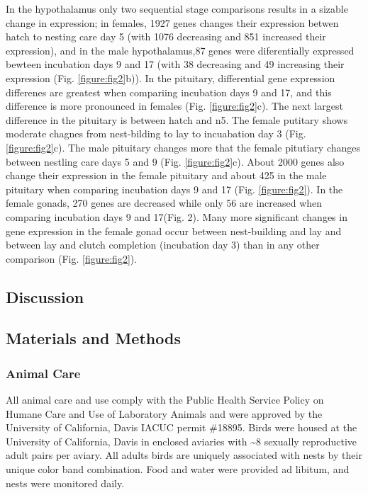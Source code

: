In the hypothalamus only two sequential stage comparisons results in a
sizable change in expression; in females, 1927 genes changes their
expression betwen hatch to nesting care day 5 (with 1076 decreasing and
851 increased their expression), and in the male hypothalamus,87 genes
were diferentially expressed bewteen incubation days 9 and 17 (with 38
decreasing and 49 increasing their expression (Fig.
\ref{figure:fig2}b)). In the pituitary, differential gene expression
differenes are greatest when compariing incubation days 9 and 17, and
this difference is more pronounced in females (Fig. \ref{figure:fig2}c).
The next largest difference in the pituitary is between hatch and n5.
The female putitary shows moderate chagnes from nest-bilding to lay to
incuabation day 3 (Fig. \ref{figure:fig2}c). The male pituitary changes
more that the female pitutiary changes between nestling care days 5 and
9 (Fig. \ref{figure:fig2}c). About 2000 genes also change their
expression in the female pituitary and about 425 in the male pituitary
when comparing incubation days 9 and 17 (Fig. \ref{figure:fig2}). In the
female gonads, 270 genes are decreased while only 56 are increased when
comparing incubation days 9 and 17(Fig. 2). Many more significant
changes in gene expression in the female gonad occur between
nest-building and lay and between lay and clutch completion (incubation
day 3) than in any other comparison (Fig. \ref{figure:fig2}).

\hypertarget{discussion}{%
\subsection{Discussion}\label{discussion}}

\hypertarget{materials-and-methods}{%
\subsection{Materials and Methods}\label{materials-and-methods}}

\hypertarget{animal-care}{%
\subsubsection{Animal Care}\label{animal-care}}

All animal care and use comply with the Public Health Service Policy on
Humane Care and Use of Laboratory Animals and were approved by the
University of California, Davis IACUC permit \#18895. Birds were housed
at the University of California, Davis in enclosed aviaries with
\textasciitilde{}8 sexually reproductive adult pairs per aviary. All
adults birds are uniquely associated with nests by their unique color
band combination. Food and water were provided ad libitum, and nests
were monitored daily.

